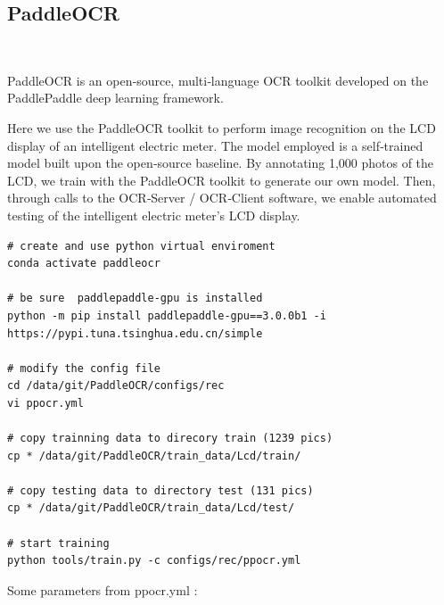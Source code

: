 
\subsection{ PaddleOCR }\

PaddleOCR is an open‑source, multi‑language OCR toolkit developed on the PaddlePaddle deep learning framework.

Here we use the PaddleOCR toolkit to perform image recognition on the LCD display of an intelligent electric meter. The model employed is a self‑trained model built upon the open‑source baseline. By annotating 1,000 photos of the LCD, we train with the PaddleOCR toolkit to generate our own model. Then, through calls to the OCR‑Server / OCR‑Client software, we enable automated testing of the intelligent electric meter’s LCD display.

\vspace{0.5cm}

\begin{lstlisting}
# create and use python virtual enviroment
conda activate paddleocr

# be sure  paddlepaddle-gpu is installed
python -m pip install paddlepaddle-gpu==3.0.0b1 -i https://pypi.tuna.tsinghua.edu.cn/simple

# modify the config file
cd /data/git/PaddleOCR/configs/rec
vi ppocr.yml

# copy trainning data to direcory train (1239 pics)
cp * /data/git/PaddleOCR/train_data/Lcd/train/

# copy testing data to directory test (131 pics)
cp * /data/git/PaddleOCR/train_data/Lcd/test/

# start training
python tools/train.py -c configs/rec/ppocr.yml

\end{lstlisting}

Some parameters from ppocr.yml : 

